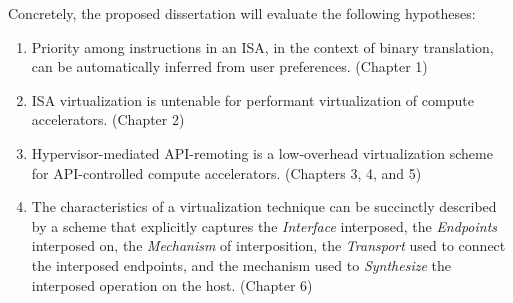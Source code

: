 \noindent Concretely, the proposed dissertation will evaluate the following
hypotheses:
\begin{enumerate}[noitemsep, topsep=0pt, leftmargin=1em, labelwidth=*, align=left, label=\textbf{H \arabic*:}]
\item Priority among instructions in an ISA, in the context of binary
translation, can be automatically inferred from user preferences. (Chapter 1)
\item ISA virtualization is untenable for performant virtualization of compute
accelerators. (Chapter 2)
\item Hypervisor-mediated API-remoting is a low-overhead virtualization scheme
for API-controlled compute accelerators. (Chapters 3, 4, and 5)
\item The characteristics of a virtualization technique can be succinctly
described by a scheme that explicitly captures the \textit{Interface}
interposed, the \textit{Endpoints} interposed on, the \textit{Mechanism} of
interposition, the \textit{Transport} used to connect the interposed
endpoints, and the mechanism used to \textit{Synthesize} the interposed
operation on the host. (Chapter 6)
\end{enumerate}